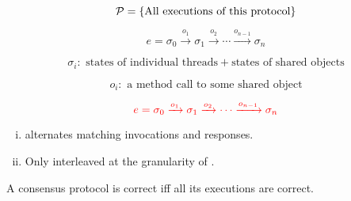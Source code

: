 \begin{frame}{}
  \begin{description}[<+->]
    \item[Protocol] 
      \[
	\mathcal{P} = \{\text{All executions of this protocol}\}
      \]
    \item[Execution] 
      \[
	e = \sigma_0 \xrightarrow{o_1} \sigma_1 \xrightarrow{o_2} \cdots \xrightarrow{o_{n-1}} \sigma_{n}
      \]
    \item[State] 
      \[
	\sigma_i: \text{ states of individual threads} + \text{states of shared objects}
      \]
    \item[Operation] 
      \[
	o_i: \text{ a method call to some shared object}
      \]
  \end{description}
\end{frame}

\begin{frame}{}
  \[
    \textcolor{red}{e = \sigma_0 \xrightarrow{o_1} \sigma_1 \xrightarrow{o_2} \cdots \xrightarrow{o_{n-1}} \sigma_{n}}
  \]

  \begin{enumerate}[(i)]
    \item {} alternates matching invocations and responses.
    \item Only interleaved at the granularity of .
  \end{enumerate}

  \vspace{0.30cm}
  \begin{theorem}[]
    A consensus protocol is correct iff all its  executions are correct.
  \end{theorem}
\end{frame}
